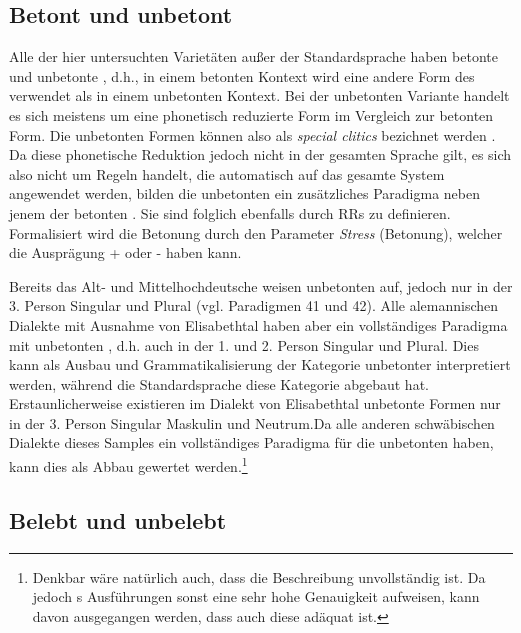 \subsection{Betont und unbetont}\label{5.3.2}

Alle der hier untersuchten Varietäten außer der Standardsprache haben betonte und unbetonte , d.h., in einem betonten Kontext wird eine andere Form des  verwendet als in einem unbetonten Kontext. Bei der unbetonten Variante handelt es sich meistens um eine phonetisch reduzierte Form im Vergleich zur betonten Form. Die unbetonten Formen können also als \textit{special clitics} bezichnet werden \citep[510--511]{ZwickyPullum1983}. Da diese phonetische Reduktion jedoch nicht in der gesamten Sprache gilt, es sich also nicht um Regeln handelt, die automatisch auf das gesamte System angewendet werden, bilden die unbetonten  ein zusätzliches Paradigma neben jenem der betonten . Sie sind folglich ebenfalls durch RRs zu definieren. Formalisiert wird die Betonung durch den Parameter \textit{Stress} (Betonung), welcher die Ausprägung + oder - haben kann.

Bereits das Alt- und Mittelhochdeutsche weisen unbetonten  auf, jedoch nur in der 3. Person Singular und Plural (vgl. Paradigmen 41 und 42). Alle alemannischen Dialekte mit Ausnahme von Elisabethtal haben aber ein vollständiges Paradigma mit unbetonten , d.h. auch in der 1. und 2. Person Singular und Plural. Dies kann als Ausbau und Grammatikalisierung der Kategorie unbetonter  interpretiert werden, während die Standardsprache diese Kategorie abgebaut hat. Erstaunlicherweise existieren im Dialekt von Elisabethtal unbetonte Formen nur in der 3. Person Singular Maskulin und Neutrum.\largerpage[2] Da alle anderen schwäbischen Dialekte dieses Samples ein vollständiges Paradigma für die unbetonten  haben, kann dies als Abbau gewertet werden.\footnote{Denkbar wäre natürlich auch, dass die Beschreibung unvollständig ist. Da jedoch \citeauthor{Žirmunskij1928/29}s \citeyearpar{Žirmunskij1928/29} Ausführungen sonst eine sehr hohe Genauigkeit aufweisen, kann davon ausgegangen werden, dass auch diese adäquat ist.}

\subsection{Belebt und unbelebt}\label{5.3.3}

